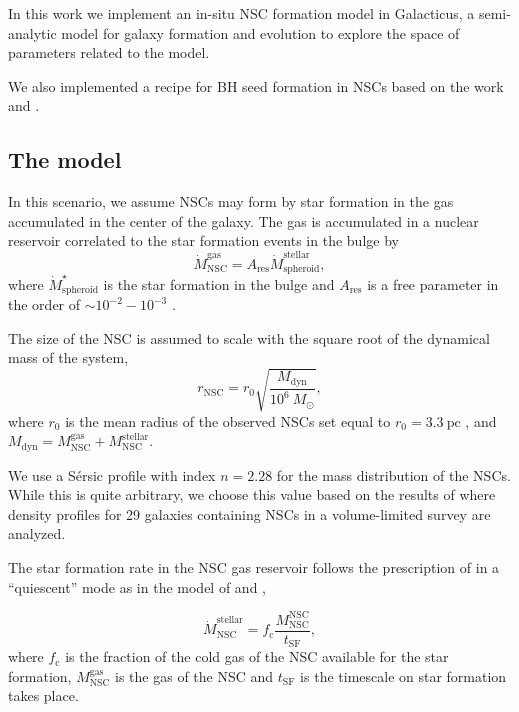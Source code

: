 \documentclass[baaa]{baaa}
\begin{document}
In this work we implement an in-situ NSC formation model in {\sc Galacticus},  a semi-analytic model for galaxy formation and evolution \citep{BENSON2012} to explore the space of parameters related to the model.  

We also implemented a recipe for BH seed formation in NSCs based on the work \cite{ESCALA2021} and \cite{VERGARA2023}.

\subsection{The model}
In this scenario, we assume NSCs may form by star formation in the gas accumulated in the center of the galaxy. The gas is accumulated in a nuclear reservoir correlated to the star formation events in the bulge \citep{GRANATO2004,HAIMAN2004,LAPI2014,ANTONINI2015,NEUMAYER2011} by
\begin{equation}
\dot{M}_\mathrm{NSC}^\mathrm{gas} = A_\mathrm{res}\dot{M}_\mathrm{spheroid}^\mathrm{stellar},
\end{equation}
where $\dot{M}_\mathrm{spheroid}^\mathrm{\star}$ is the star formation in the bulge and $A_\mathrm{res}$ is a free parameter in the order of $\sim10^{-2}-10^{-3}$ \citep{ANTONINI2015}.

The size of the NSC is assumed to scale with the square root of the dynamical mass of the system, 
\begin{equation}
r_\mathrm{NSC} = r_0\sqrt{\frac{M_\mathrm{dyn}}{10^{6}~M_\odot}},
\end{equation}
where $r_0$ is the mean radius of the observed NSCs set equal to $r_0=3.3~\mathrm{pc}$ \citep{NEUMAYER2020}, and $M_\mathrm{dyn}=M_\mathrm{NSC}^\mathrm{gas}+M_\mathrm{NSC}^\mathrm{stellar}$.

We use a S\'ersic profile with index $n=2.28$ for the mass distribution of the NSCs. While this is quite arbitrary, we choose this value based on the results of \cite{PECHETTI2020} where density profiles for 29 galaxies containing NSCs in a volume-limited survey are analyzed.

The star formation rate in the NSC gas reservoir follows the prescription of \cite{KRUMHOLZ2009} in a ``quiescent'' mode as in the model of \cite{SESANA2014} and \cite{ANTONINI2015}, 

\begin{equation}
\dot{M}_\mathrm{NSC}^\mathrm{stellar} = f_\mathrm{c} \frac{M_\mathrm{NSC}^\mathrm{NSC}}{t_\mathrm{SF}},
\end{equation}
where $f_\mathrm{c}$ is the fraction of the cold gas of the NSC available for the star formation, $M_\mathrm{NSC}^\mathrm{gas}$ is the gas of the NSC and $t_\mathrm{SF}$ is the timescale on star formation takes place.
\end{document}
